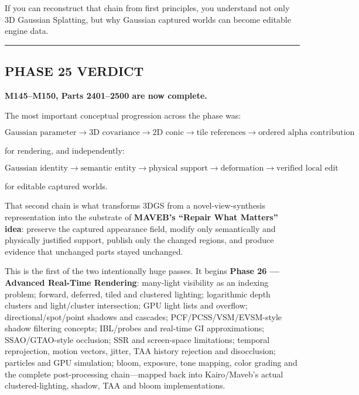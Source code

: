 If you can reconstruct that chain from first principles, you understand not only 3D Gaussian Splatting, but why Gaussian captured worlds can become editable engine data.

\begin{center}\rule{0.5\linewidth}{0.5pt}\end{center}

\subsection{PHASE 25 VERDICT}\label{06-engine-ii-ch045-phase-25-verdict}

\hypertarget{06-engine-ii-ch045-phase-25-verdict}{}

\textbf{M145--M150, Parts 2401--2500 are now complete.}

The most important conceptual progression across the phase was:

\[
\boxed{
\text{Gaussian parameter}
\rightarrow
\text{3D covariance}
\rightarrow
\text{2D conic}
\rightarrow
\text{tile references}
\rightarrow
\text{ordered alpha contribution}
}
\]

for rendering, and independently:

\[
\boxed{
\text{Gaussian identity}
\rightarrow
\text{semantic entity}
\rightarrow
\text{physical support}
\rightarrow
\text{deformation}
\rightarrow
\text{verified local edit}
}
\]

for editable captured worlds.

That second chain is what transforms 3DGS from a novel-view-synthesis representation into the substrate of \textbf{MAVEB's ``Repair What Matters'' idea}: preserve the captured appearance field, modify only semantically and physically justified support, publish only the changed regions, and produce evidence that unchanged parts stayed unchanged.

This is the first of the two intentionally huge passes. It begins \textbf{Phase 26 --- Advanced Real-Time Rendering}: many-light visibility as an indexing problem; forward, deferred, tiled and clustered lighting; logarithmic depth clusters and light/cluster intersection; GPU light lists and overflow; directional/spot/point shadows and cascades; PCF/PCSS/VSM/EVSM-style shadow filtering concepts; IBL/probes and real-time GI approximations; SSAO/GTAO-style occlusion; SSR and screen-space limitations; temporal reprojection, motion vectors, jitter, TAA history rejection and disocclusion; particles and GPU simulation; bloom, exposure, tone mapping, color grading and the complete post-processing chain---mapped back into Kairo/Maveb's actual clustered-lighting, shadow, TAA and bloom implementations.

